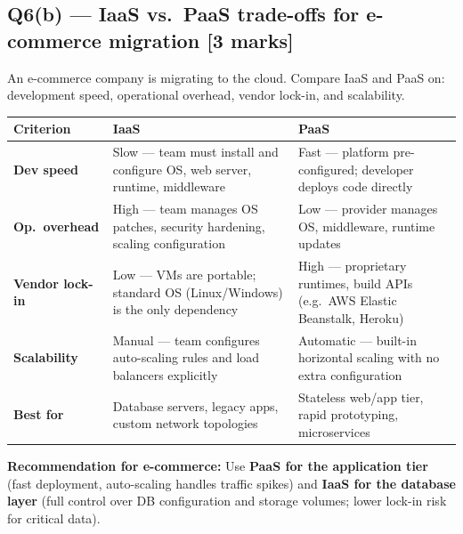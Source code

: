 \documentclass[12pt, a4paper]{article}
\newenvironment{qbox}{\begin{mdframed}[style=qframe]}{\end{mdframed}}
\newenvironment{solbox}{\begin{mdframed}[style=solframe]}{\end{mdframed}}
\newcommand{\qmarks}[1]{\hfill\textbf{\color{orange!70!black}[#1 marks]}}
\begin{document}
\subsection{Q6(b) --- IaaS vs.\ PaaS trade-offs for e-commerce migration
  \texorpdfstring{\qmarks{3}}{}}
\begin{qbox}An e-commerce company is migrating to the cloud. Compare IaaS and PaaS on:
development speed, operational overhead, vendor lock-in, and scalability.\end{qbox}
\begin{solbox}
\begin{center}\renewcommand{\arraystretch}{1.35}
\begin{tabularx}{\linewidth}{l X X}
\toprule
\textbf{Criterion} & \textbf{IaaS} & \textbf{PaaS} \\
\midrule
\textbf{Dev speed}  & Slow --- team must install and configure OS, web server, runtime,
                      middleware & Fast --- platform pre-configured; developer deploys code directly \\[4pt]
\textbf{Op.\ overhead} & High --- team manages OS patches, security hardening, scaling
                      configuration & Low --- provider manages OS, middleware, runtime updates \\[4pt]
\textbf{Vendor lock-in} & Low --- VMs are portable; standard OS (Linux/Windows) is the only
                      dependency & High --- proprietary runtimes, build APIs (e.g.\ AWS Elastic
                      Beanstalk, Heroku) \\[4pt]
\textbf{Scalability} & Manual --- team configures auto-scaling rules and load balancers
                      explicitly & Automatic --- built-in horizontal scaling with no extra
                      configuration \\[4pt]
\midrule
\textbf{Best for} & Database servers, legacy apps, custom network topologies & Stateless web/app
                    tier, rapid prototyping, microservices \\
\bottomrule
\end{tabularx}\end{center}

\textbf{Recommendation for e-commerce:} Use \textbf{PaaS for the application tier} (fast
deployment, auto-scaling handles traffic spikes) and \textbf{IaaS for the database layer}
(full control over DB configuration and storage volumes; lower lock-in risk for critical
data).
\end{solbox}

\end{document}
